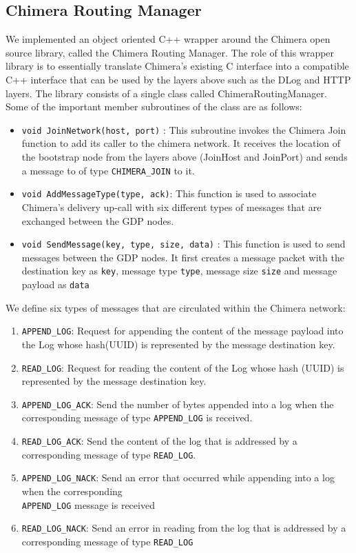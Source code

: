 \subsection{Chimera Routing Manager}
We implemented an object oriented C++ wrapper around the Chimera open source library, called the Chimera Routing Manager. The role of this wrapper library is to essentially translate Chimera’s existing C interface into a compatible C++ interface that can be used by the layers above such as the DLog and HTTP layers. The library consists of a single class called ChimeraRoutingManager. Some of the important member subroutines of the class are as follows:
 \begin{itemize}
\item \texttt{void JoinNetwork(host, port)} : This subroutine invokes the Chimera Join function to add its caller to the chimera network. It receives the location of the bootstrap node from the layers above (JoinHost and JoinPort) and sends a message to of type \texttt{CHIMERA\_JOIN} to it.
 \item \texttt{void AddMessageType(type, ack)}: This function is used to associate Chimera’s delivery up-call with six different types of messages that are exchanged between the GDP nodes.
 \item \texttt{void SendMessage(key, type, size, data)} : This function is used to send messages between the GDP nodes. It first creates a message packet with the destination key as \texttt{key}, message type \texttt{type}, message size \texttt{size} and message payload as \texttt{data}
 \end{itemize}
 
 We define six types of messages that are circulated within the Chimera network:
 \begin{enumerate} 
\item \texttt{APPEND\_LOG}: Request for appending the content of the message payload into the Log whose hash(UUID) is represented by the message destination key.
\item \texttt{READ\_LOG}:  Request for reading the content of the Log whose hash (UUID) is represented by the message destination key.
\item \texttt{APPEND\_LOG\_ACK}: Send the number of bytes appended into a log when the corresponding message of type \texttt{APPEND\_LOG} is received.
\item \texttt{READ\_LOG\_ACK}: Send the content of the log that is addressed by a corresponding message of type \texttt{READ\_LOG}.
\item \texttt{APPEND\_LOG\_NACK}: Send an error that occurred while appending into a log when the corresponding\\\texttt{APPEND\_LOG} message is received
\item \texttt{READ\_LOG\_NACK}: Send an error in reading from the log that is addressed by a corresponding message of type \texttt{READ\_LOG}
\end{enumerate}


